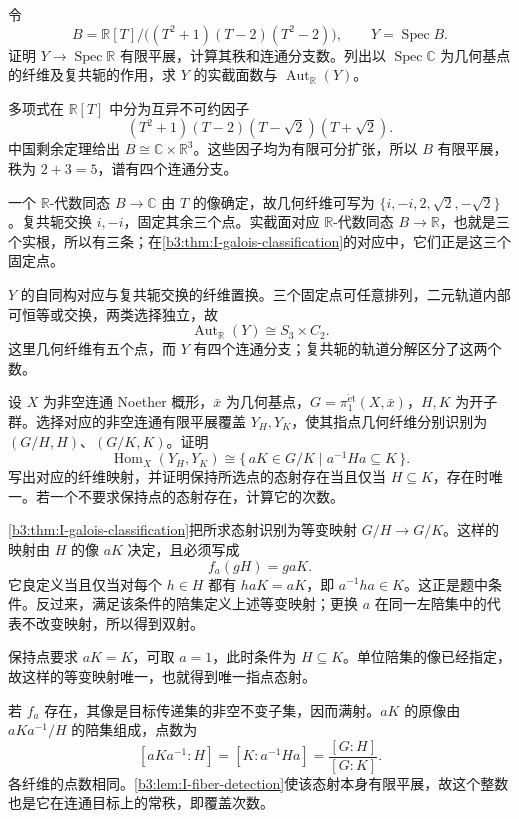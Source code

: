 
\begin{exercise}\label{b3:ex:I-real-polynomial-fiber}
	令
	\[
		B=\mathbb R[T]/\bigl((T^2+1)(T-2)(T^2-2)\bigr),
		\qquad Y=\operatorname{Spec}B.
	\]
	证明 \(Y\rightarrow\operatorname{Spec}\mathbb R\) 有限平展，计算其秩和连通分支数。列出以 \(\operatorname{Spec}\mathbb C\) 为几何基点的纤维及复共轭的作用，求 \(Y\) 的实截面数与 \(\operatorname{Aut}_{\mathbb R}(Y)\)。
\end{exercise}
\begin{solution}
	多项式在 \(\mathbb R[T]\) 中分为互异不可约因子
	\[
		(T^2+1)(T-2)(T-\sqrt2)(T+\sqrt2).
	\]
	中国剩余定理给出 \(B\cong\mathbb C\times\mathbb R^3\)。这些因子均为有限可分扩张，所以 \(B\) 有限平展，秩为 \(2+3=5\)，谱有四个连通分支。

	一个 \(\mathbb R\)-代数同态 \(B\rightarrow\mathbb C\) 由 \(T\) 的像确定，故几何纤维可写为 \(\{i,-i,2,\sqrt2,-\sqrt2\}\)。复共轭交换 \(i,-i\)，固定其余三个点。实截面对应 \(\mathbb R\)-代数同态 \(B\rightarrow\mathbb R\)，也就是三个实根，所以有三条；在\cref{b3:thm:I-galois-classification}的对应中，它们正是这三个固定点。

	\(Y\) 的自同构对应与复共轭交换的纤维置换。三个固定点可任意排列，二元轨道内部可恒等或交换，两类选择独立，故
	\[
		\operatorname{Aut}_{\mathbb R}(Y)\cong S_3\times C_2.
	\]
	这里几何纤维有五个点，而 \(Y\) 有四个连通分支；复共轭的轨道分解区分了这两个数。
\end{solution}

\begin{exercise}\label{b3:ex:I-cover-morphisms-cosets}
	设 \(X\) 为非空连通 Noether 概形，\(\bar x\) 为几何基点，\(G=\pi_1^{\mathrm{\acute et}}(X,\bar x)\)，\(H,K\) 为开子群。选择对应的非空连通有限平展覆盖 \(Y_H,Y_K\)，使其指点几何纤维分别识别为 \((G/H,H)\)、\((G/K,K)\)。证明
	\[
		\operatorname{Hom}_X(Y_H,Y_K)
		\cong\{\,aK\in G/K\mid a^{-1}Ha\subseteq K\,\}.
	\]
	写出对应的纤维映射，并证明保持所选点的态射存在当且仅当 \(H\subseteq K\)，存在时唯一。若一个不要求保持点的态射存在，计算它的次数。
\end{exercise}
\begin{solution}
	\cref{b3:thm:I-galois-classification}把所求态射识别为等变映射 \(G/H\rightarrow G/K\)。这样的映射由 \(H\) 的像 \(aK\) 决定，且必须写成
	\[
		f_a(gH)=gaK.
	\]
	它良定义当且仅当对每个 \(h\in H\) 都有 \(haK=aK\)，即 \(a^{-1}ha\in K\)。这正是题中条件。反过来，满足该条件的陪集定义上述等变映射；更换 \(a\) 在同一左陪集中的代表不改变映射，所以得到双射。

	保持点要求 \(aK=K\)，可取 \(a=1\)，此时条件为 \(H\subseteq K\)。单位陪集的像已经指定，故这样的等变映射唯一，也就得到唯一指点态射。

	若 \(f_a\) 存在，其像是目标传递集的非空不变子集，因而满射。\(aK\) 的原像由 \(aKa^{-1}/H\) 的陪集组成，点数为
	\[
		[aKa^{-1}:H]=[K:a^{-1}Ha]
		=\frac{[G:H]}{[G:K]}.
	\]
	各纤维的点数相同。\cref{b3:lem:I-fiber-detection}使该态射本身有限平展，故这个整数也是它在连通目标上的常秩，即覆盖次数。
\end{solution}

